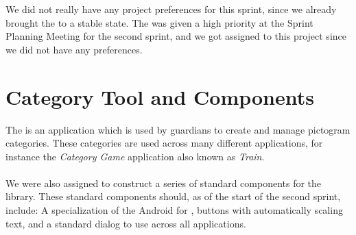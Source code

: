 \FloatBarrier

We did not really have any project preferences for this sprint, since we already brought the \launcher to a stable state. The \giraf \ct was given a high priority at the Sprint Planning Meeting for the second sprint, and we got assigned to this project since we did not have any preferences. 

\section{Category Tool and Components}
\label{sec:category_tool_and_components}

The \giraf \ct is an application which is used by guardians to create and manage pictogram categories. These categories are used across many different applications, for instance the \emph{Category Game} application also known as \emph{Train}.
\\\\
We were also assigned to construct a series of standard components for the \gc library. These standard components should, as of the start of the second sprint, include: A specialization of the Android  for \giraf, buttons with automatically scaling text, and a standard dialog to use across all applications.





